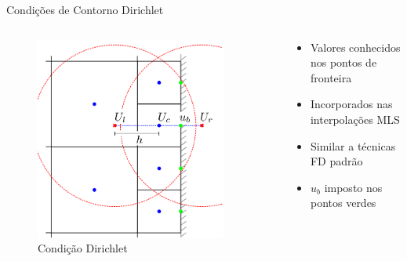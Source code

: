 \documentclass[../main/main.tex]{subfiles}
\begin{document}
\begin{frame}{Condições de Contorno Dirichlet}
\begin{columns}[T]
\begin{column}{0.4\textwidth}
\begin{figure}
\centering
\includegraphics[width=0.9\textwidth]{imgs/figura3a.png}
\caption{Condição Dirichlet}
\end{figure}
\end{column}
\begin{column}{0.6\textwidth}
\begin{itemize}
\item Valores conhecidos nos pontos de fronteira
\item Incorporados nas interpolações MLS
\item Similar a técnicas FD padrão
\item $u_b$ imposto nos pontos verdes
\end{itemize}
\end{column}
\end{columns}
\end{frame}
\end{document}
